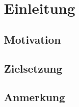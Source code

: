 \chapter{Einleitung}

\thispagestyle{standard}
\pagestyle{standard}
\section{Motivation}



\section{Zielsetzung}


\section{Anmerkung}












